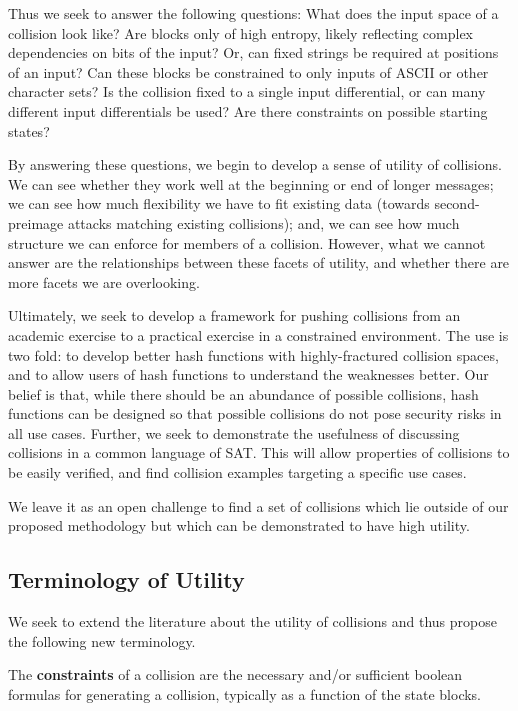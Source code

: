 \documentclass[letterpaper,twocolumn,10pt]{article}
\begin{document}
Thus we seek to answer the following questions: What does the input space of
a collision look like? Are blocks only of high entropy, likely reflecting
complex dependencies on bits of the input? Or, can fixed strings be required at
positions of an input? Can these blocks be constrained to only inputs of ASCII
or other character sets? Is the collision fixed to a single input differential,
or can many different input differentials be used? Are there constraints on
possible starting states?

By answering these questions, we begin to develop a sense of utility of
collisions. We can see whether they work well at the beginning or end of
longer messages; we can see how much flexibility we have to fit existing
data (towards second-preimage attacks matching existing collisions); and, we
can see how much structure we can enforce for members of a collision. However,
what we cannot answer are the relationships between these facets of utility,
and whether there are more facets we are overlooking.

Ultimately, we seek to develop a framework for pushing collisions from an
academic exercise to a practical exercise in a constrained environment. The
use is two fold: to develop better hash functions with highly-fractured collision
spaces, and to allow users of hash functions to understand the weaknesses
better. Our belief is that, while there should be an abundance of possible
collisions, hash functions can be designed so that possible collisions do not
pose security risks in all use cases. Further, we seek to demonstrate the
usefulness of discussing collisions in a common language of SAT. This will
allow properties of collisions to be easily verified, and find collision
examples targeting a specific use cases.

We leave it as an open challenge to find a set of collisions which lie outside
of our proposed methodology but which can be demonstrated to have high utility.

\subsection{Terminology of Utility}

We seek to extend the literature about the utility of collisions and thus
propose the following new terminology.

The \textbf{constraints} of a collision are the necessary and/or sufficient
boolean formulas for generating a collision, typically as a function of the
state blocks.
\end{document}
